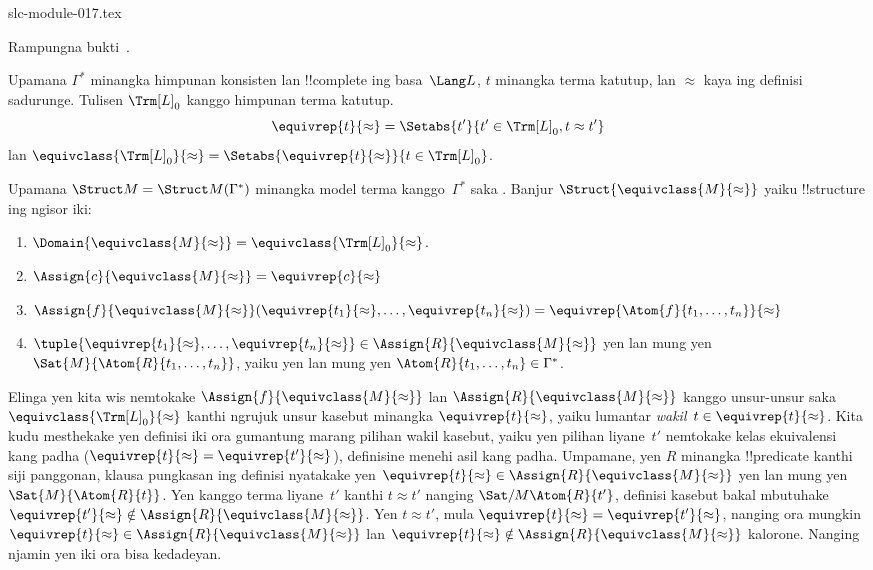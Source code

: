 \begin{filecontents*}[overwrite]{slc-module-017.tex}
\begin{prob}
Rampungna bukti~.
\end{prob}

\begin{defn}
Upamana $\Gamma^*$ minangka himpunan konsisten lan !!{complete} ing
basa~$\Lang L$, $t$ minangka terma katutup, lan $\approx$ kaya ing
definisi sadurunge. Tulisen ${\Trm[L]}_0$ kanggo himpunan terma katutup.
\[
\equivrep{t}{\approx} = \Setabs{t'}{t'\in {\Trm[L]}_0, t \approx t'}
\]
lan $\equivclass{{\Trm[L]}_0}{\approx} = \Setabs{\equivrep{t}{\approx}}{t \in {\Trm[L]}_0}$.
\end{defn}

\begin{defn}
Upamana $\Struct M = \Struct M(\Gamma^*)$ minangka model terma
kanggo~$\Gamma^*$ saka . Banjur
$\Struct{\equivclass{M}{\approx}}$ yaiku !!{structure} ing ngisor iki:
\begin{enumerate}
\item $\Domain{\equivclass{M}{\approx}} = \equivclass{{\Trm[L]}_0}{\approx}$.
\item $\Assign{c}{\equivclass{M}{\approx}} = \equivrep{c}{\approx}$
\item $\Assign{f}{\equivclass{M}{\approx}}(\equivrep{t_1}{\approx}, \dots,
  \equivrep{t_n}{\approx}) = \equivrep{\Atom{f}{t_1,\dots, t_n}}{\approx}$
\item $\tuple{\equivrep{t_1}{\approx}, \dots, \equivrep{t_n}{\approx}} \in
  \Assign{R}{\equivclass{M}{\approx}}$ yen lan mung yen
  $\Sat{M}{\Atom{R}{t_1,\dots, t_n}}$, yaiku yen lan mung yen
  $\Atom{R}{t_1,\dots, t_n} \in \Gamma^*$.
\end{enumerate}
\end{defn}

\begin{explain}
Elinga yen kita wis nemtokake $\Assign{f}{\equivclass{M}{\approx}}$
lan $\Assign{R}{\equivclass{M}{\approx}}$ kanggo unsur-unsur saka
$\equivclass{{\Trm[L]}_0}{\approx}$ kanthi ngrujuk unsur kasebut minangka
$\equivrep{t}{\approx}$, yaiku lumantar
\emph{wakil}~$t \in \equivrep{t}{\approx}$. Kita kudu mesthekake yen
definisi iki ora gumantung marang pilihan wakil kasebut, yaiku yen
pilihan liyane~$t'$ nemtokake kelas ekuivalensi kang padha
($\equivrep{t}{\approx} = \equivrep{t'}{\approx}$), definisine menehi
asil kang padha. Umpamane, yen $R$ minangka !!{predicate} kanthi siji
panggonan, klausa pungkasan ing definisi nyatakake yen
$\equivrep{t}{\approx} \in \Assign{R}{\equivclass{M}{\approx}}$ yen lan
mung yen $\Sat{M}{\Atom{R}{t}}$. Yen kanggo terma liyane~$t'$ kanthi
$t \approx t'$ nanging $\Sat/{M}{\Atom{R}{t'}}$, definisi kasebut
bakal mbutuhake $\equivrep{t'}{\approx} \notin
\Assign{R}{\equivclass{M}{\approx}}$. Yen $t \approx t'$, mula
$\equivrep{t}{\approx} = \equivrep{t'}{\approx}$, nanging ora mungkin
$\equivrep{t}{\approx} \in \Assign{R}{\equivclass{M}{\approx}}$ lan
$\equivrep{t}{\approx} \notin
\Assign{R}{\equivclass{M}{\approx}}$ kalorone. Nanging
 njamin yen iki ora bisa kedadeyan.
\end{explain}


\end{filecontents*}
